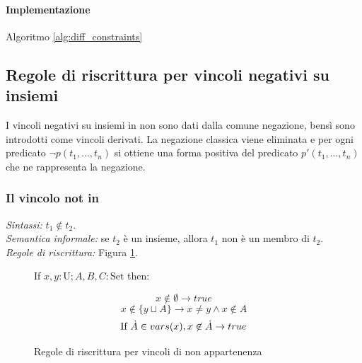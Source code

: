 \documentclass[12pt,a4paper,openright]{book} %
\begin{document}
\paragraph{Implementazione}
Algoritmo \ref{alg:diff_constraints}

\subsection{Regole di riscrittura per vincoli negativi su insiemi}
\label{subsec:clpbasedlang_lset_rewriteneg}

I vincoli negativi su insiemi in \lset{} non sono dati dalla comune negazione, bensì sono introdotti come vincoli derivati. La negazione classica viene eliminata e per ogni predicato $\neg p(t_1, \ldots, t_n)$ si ottiene una forma positiva del predicato $p'(t_1, \ldots, t_n)$ che ne rappresenta la negazione. 

\subsubsection{Il vincolo not in}

\textit{Sintassi:} $t_1 \not\in t_2$.\\
\noindent\textit{Semantica informale:} se $t_2$ è un insieme, allora $t_1$ non è un membro di $t_2$.\\
\noindent\textit{Regole di riscrittura:} Figura \ref{fig:notin_constraints}.

\begin{figure}
	\begin{tcolorbox}[colframe=black, colback=white, sharp corners]
		\setcounter{equation}{3}
		\renewcommand{\theequation}{$\in$\textsubscript{\arabic{equation}}}
		
		If $x, y: \text{U}; A, B, C: \text{Set}$ then:
		
		\begin{equation}
		x \not\in \emptyset \to true
		\end{equation}
		\begin{equation}
		x \not\in \{ y \sqcup A \} \to x \neq y \land x \not\in A
		\end{equation}
		\begin{equation}
		\text{If } \dot{A} \in vars(x), x \not\in \dot{A} \to true
		\end{equation}
		
	\end{tcolorbox}
	
	\caption{Regole di riscrittura per vincoli di non appartenenza}
	\label{fig:notin_constraints}
\end{figure}
\end{document}
